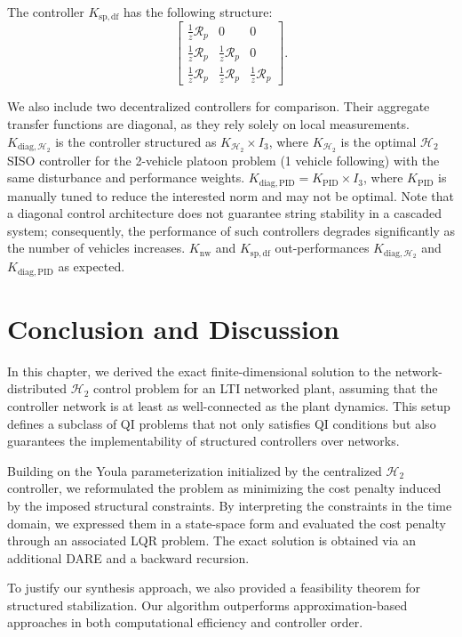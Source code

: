 The controller $K_{\mathrm{sp,df}}$ has the following structure:
\[
\begin{bmatrix}
\frac{1}{z}\mathcal{R}_p & 0 & 0 \\
\frac{1}{z}\mathcal{R}_p & \frac{1}{z}\mathcal{R}_p & 0 \\
\frac{1}{z}\mathcal{R}_p & \frac{1}{z}\mathcal{R}_p & \frac{1}{z}\mathcal{R}_p
\end{bmatrix}.
\]

We also include two decentralized controllers for comparison. Their aggregate transfer functions are diagonal, as they rely solely on local measurements.
\(K_{\mathrm{diag},\mathcal{H}_2}\) is the controller structured as \(K_{\mathcal{H}_2}\times I_3\), where \(K_{\mathcal{H}_2}\) is the optimal \(\mathcal{H}_2\) SISO controller for the 2-vehicle platoon problem (1 vehicle following) with the same disturbance and performance weights.
\(K_{\mathrm{diag, PID}} = K_{\mathrm{PID}}\times I_3\), where \(K_{\mathrm{PID}}\) is manually tuned to reduce the interested norm and may not be optimal. 
Note that a diagonal control architecture does not guarantee string stability in a cascaded system; consequently, the performance of such controllers degrades significantly as the number of vehicles increases.
\(K_\mathrm{nw}\) and \(K_\mathrm{sp,df}\) out-performances \(K_{\mathrm{diag},\mathcal{H}_2}\) and \(K_{\mathrm{diag, PID}}\) as expected. 



\section{Conclusion and Discussion}

In this chapter, we derived the exact finite-dimensional solution to the network-distributed $\mathcal{H}_2$ control problem for an LTI networked plant, assuming that the controller network is at least as well-connected as the plant dynamics. This setup defines a subclass of QI problems that not only satisfies QI conditions but also guarantees the implementability of structured controllers over networks. 

Building on the Youla parameterization initialized by the centralized \(\mathcal{H}_2\) controller, we reformulated the problem as minimizing the cost penalty induced by the imposed structural constraints. By interpreting the constraints in the time domain, we expressed them in a state-space form and evaluated the cost penalty through an associated LQR problem. The exact solution is obtained via an additional DARE and a backward recursion.

To justify our synthesis approach, we also provided a feasibility theorem for structured stabilization. Our algorithm outperforms approximation-based approaches in both computational efficiency and controller order.